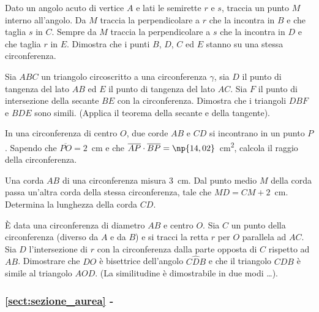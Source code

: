 \begin{esercizio}
\label{ese:6.102}
Dato un angolo acuto di vertice $A$ e lati le semirette $r$ e $s$, traccia un punto $M$ interno all'angolo. Da $M$ traccia la perpendicolare a $r$ che la incontra in $B$ e che taglia $s$ in $C$. Sempre da $M$ traccia la perpendicolare a $s$ che la incontra in $D$ e che taglia $r$ in $E$. Dimostra che i punti $B$, $D$, $C$ ed $E$ stanno su una stessa circonferenza. 
\end{esercizio}

\begin{esercizio}
\label{ese:6.103}
Sia $ABC$ un triangolo circoscritto a una circonferenza $\gamma$, sia $D$ il punto di tangenza del lato $AB$ ed $E$ il punto di tangenza del lato $AC$. Sia $F$ il punto di intersezione della secante $BE$ con la circonferenza. Dimostra che i triangoli $DBF$ e $BDE$ sono simili. (Applica il teorema della secante e della tangente).
\end{esercizio}

\begin{esercizio}
\label{ese:6.104}
In una circonferenza di centro $O$, due corde $AB$ e $CD$ si incontrano in un punto $P$. Sapendo che $\overline{PO}=2$~cm e che $\overline{AP}\cdot \overline{BP}=\np{14,02}$~cm\textsuperscript{2}, calcola il raggio della circonferenza.
\end{esercizio}

\begin{esercizio}
\label{ese:6.105}
Una corda $AB$ di una circonferenza misura 3~cm. Dal punto medio $M$ della corda passa un'altra corda della stessa circonferenza, tale che $MD=CM+2$~cm. Determina la lunghezza della corda $CD$.
\end{esercizio}

\begin{esercizio}
\label{ese:6.106}
\`E data una circonferenza di diametro $AB$ e centro $O$. Sia $C$ un punto della circonferenza (diverso da $A$ e da $B$) e si tracci la retta $r$ per $O$ parallela ad $AC$. Sia $D$ l'intersezione di $r$ con la circonferenza dalla parte opposta di $C$ rispetto ad $AB$. Dimostrare che $DO$ è bisettrice dell'angolo $C\widehat{D}B$ e che il triangolo $CDB$ è simile al triangolo $AOD$. (La similitudine è dimostrabile in due modi \ldots{}).
\end{esercizio}

\begingroup
\hypersetup{linkcolor=black}
\subsubsection*{\ref{sect:sezione_aurea} - }
\endgroup

